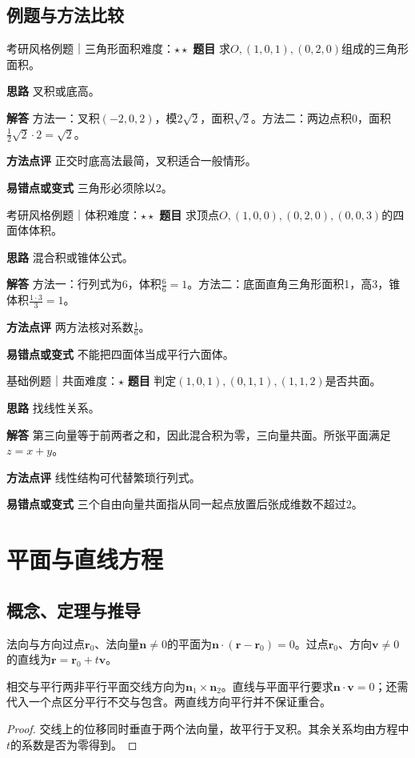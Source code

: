 \subsection{例题与方法比较}
\begin{example}{考研风格例题｜三角形面积}{难度：$\star\star$}
\label{ex:5:4}\textbf{题目} 求$O,(1,0,1),(0,2,0)$组成的三角形面积。\par
\textbf{思路} 叉积或底高。\par
\textbf{解答} 方法一：叉积$(-2,0,2)$，模$2\sqrt2$，面积$\sqrt2$。方法二：两边点积0，面积$\frac12\sqrt2\cdot2=\sqrt2$。\par
\textbf{方法点评} 正交时底高法最简，叉积适合一般情形。\par
\textbf{易错点或变式} 三角形必须除以2。
\end{example}
\begin{example}{考研风格例题｜体积}{难度：$\star\star$}
\label{ex:5:5}\textbf{题目} 求顶点$O,(1,0,0),(0,2,0),(0,0,3)$的四面体体积。\par
\textbf{思路} 混合积或锥体公式。\par
\textbf{解答} 方法一：行列式为6，体积$\frac{6}{6}=1$。方法二：底面直角三角形面积1，高3，锥体积$\frac{1\cdot3}{3}=1$。\par
\textbf{方法点评} 两方法核对系数$\frac{1}{6}$。\par
\textbf{易错点或变式} 不能把四面体当成平行六面体。
\end{example}
\begin{example}{基础例题｜共面}{难度：$\star$}
\label{ex:5:6}\textbf{题目} 判定$(1,0,1),(0,1,1),(1,1,2)$是否共面。\par
\textbf{思路} 找线性关系。\par
\textbf{解答} 第三向量等于前两者之和，因此混合积为零，三向量共面。所张平面满足$z=x+y$。\par
\textbf{方法点评} 线性结构可代替繁琐行列式。\par
\textbf{易错点或变式} 三个自由向量共面指从同一起点放置后张成维数不超过2。
\end{example}
\section{平面与直线方程}\label{sec:5:3}
\subsection{概念、定理与推导}

\begin{definition}{法向与方向}过点$\bm r_0$、法向量$\bm n\ne0$的平面为$\bm n\cdot(\bm r-\bm r_0)=0$。过点$\bm r_0$、方向$\bm v\ne0$的直线为$\bm r=\bm r_0+t\bm v$。\end{definition}
\begin{theorem}{相交与平行}两非平行平面交线方向为$\bm n_1\times\bm n_2$。直线与平面平行要求$\bm n\cdot\bm v=0$；还需代入一个点区分平行不交与包含。两直线方向平行并不保证重合。\end{theorem}
\begin{proof}交线上的位移同时垂直于两个法向量，故平行于叉积。其余关系均由方程中$t$的系数是否为零得到。\end{proof}

